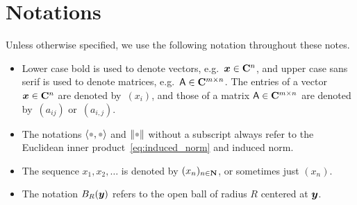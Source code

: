 \chapter{Notations}%
\label{cha:Notations}

Unless otherwise specified,
we use the following notation throughout these notes.

\begin{itemize}
    \item
        Lower case bold is used to denote vectors, e.g.\ $\mathbf{\boldsymbol{x}} \in \mathbf C^n$,
        and upper case sans serif is used to denote matrices, e.g.\ $\mathsf A \in \mathbf C^{m \times n}$.
        The entries of a vector $\mathbf{\boldsymbol{x}} \in \mathbf C^n$ are denoted by~$(x_i)$,
        and those of a matrix $\mathsf A \in \mathbf C^{m \times n}$ are denoted by~$(a_{ij})$ or~$(a_{i,j})$.

    \item 
        The notations $\ip{\placeholder,\placeholder}$ and $\norm{\placeholder}$ without a subscript always refer to the Euclidean inner product~\eqref{eq:induced_norm} and induced norm.

    \item
        The sequence $x_1, x_2, \dotsc$ is denoted by $(x_n)_{n\in \mathbf N}$, 
        or sometimes just $(x_n)$.

    \item
        The notation 
        \( 
            B_{R}(\mathbf{\boldsymbol{y}})
        \)
        refers to the open ball of radius $R$ centered at $\mathbf{\boldsymbol{y}}$.
\end{itemize}
